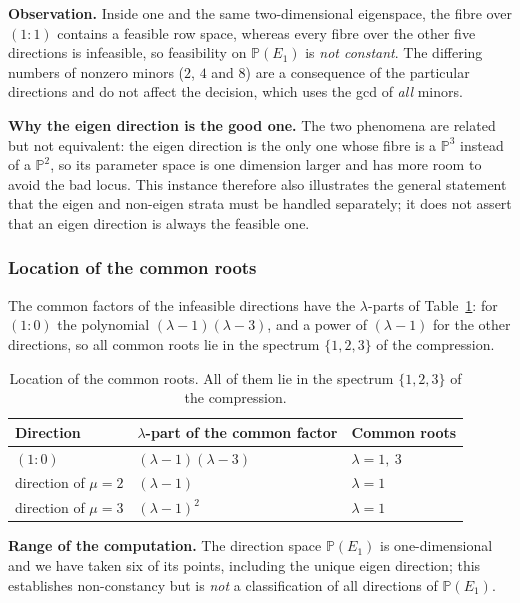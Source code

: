 \documentclass[journal]{IEEEtran}
\theoremstyle{plainn}
\theoremstyle{remark}
\begin{document}
\textbf{Observation.} Inside one and the same two-dimensional eigenspace, the fibre over $(1\!:\!1)$
contains a feasible row space, whereas every fibre over the other five directions is infeasible, so
feasibility on $\mathbb{P}(E_1)$ is \emph{not constant}. The differing numbers of nonzero minors ($2$,
$4$ and $8$) are a consequence of the particular directions and do not affect the decision, which uses
the gcd of \emph{all} minors.

\textbf{Why the eigen direction is the good one.} The two phenomena are related but not equivalent: the
eigen direction is the only one whose fibre is a $\mathbb{P}^{3}$ instead of a $\mathbb{P}^{2}$, so its
parameter space is one dimension larger and has more room to avoid the bad locus. This instance
therefore also illustrates the general statement that the eigen and non-eigen strata must be handled
separately; it does not assert that an eigen direction is always the feasible one.


\subsubsection{Location of the common roots}\label{sec6:sub:roots}


The common factors of the infeasible directions have the $\lambda$-parts of Table~\ref{sec6:tab:roots}:
for $(1\!:\!0)$ the polynomial $(\lambda-1)(\lambda-3)$, and a power of $(\lambda-1)$ for the other
directions, so all common roots lie in the spectrum $\{1,2,3\}$ of the compression.

\begin{table}[t]
\centering
\caption{Location of the common roots. All of them lie in the spectrum $\{1,2,3\}$ of the compression.}
\label{sec6:tab:roots}
\begin{tabular}{@{}lll@{}}
\toprule
Direction & $\lambda$-part of the common factor & Common roots\\
\midrule
$(1\!:\!0)$ & $(\lambda-1)(\lambda-3)$ & $\lambda=1,\ 3$\\
direction of $\mu=2$ & $(\lambda-1)$ & $\lambda=1$\\
direction of $\mu=3$ & $(\lambda-1)^{2}$ & $\lambda=1$\\
\bottomrule
\end{tabular}
\end{table}

\textbf{Range of the computation.} The direction space $\mathbb{P}(E_1)$ is one-dimensional and we
have taken six of its points, including the unique eigen direction; this establishes non-constancy but
is \emph{not} a classification of all directions of $\mathbb{P}(E_1)$.
\end{document}

